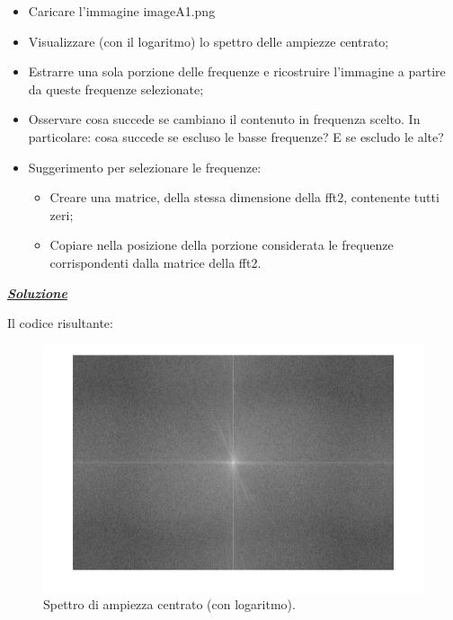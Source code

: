 \documentclass[a4paper]{article}
\begin{document}
	\begin{itemize}
		\item Caricare l'immagine \textsf{imageA1.png}
		
		\item Visualizzare (con il logaritmo) lo spettro delle ampiezze centrato;
		
		\item Estrarre una sola porzione delle frequenze e ricostruire l'immagine a partire da queste frequenze selezionate;
		
		\item Osservare cosa succede se cambiano il contenuto in frequenza scelto. In particolare: cosa succede se escluso le basse frequenze? E se escludo le alte?
		
		\item Suggerimento per selezionare le frequenze:
		\begin{itemize}
			\item Creare una matrice, della stessa dimensione della fft2, contenente tutti zeri;
			
			\item Copiare nella posizione della porzione considerata le frequenze corrispondenti dalla matrice della fft2.
		\end{itemize}
	\end{itemize}\newpage
	
	\noindent
	\textcolor{Green4}{\textbf{\emph{\underline{Soluzione}}}}\newline
	
	\noindent
	Il codice risultante:
	
	
	\begin{figure}[!htp]
		\centering
		\includegraphics[width=\textwidth]{img/lab/operato-locali-16.jpg}
		\caption{Spettro di ampiezza centrato (con logaritmo).}
	\end{figure}\newpage
	
\end{document}
